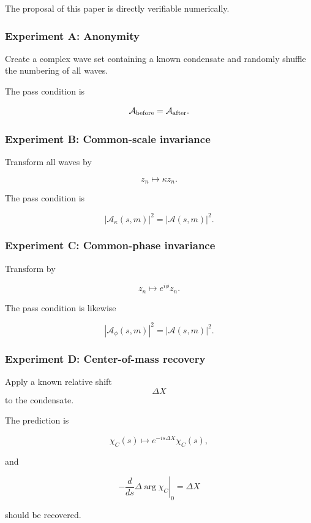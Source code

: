 \documentclass[
  a4paper,
]{article}
\begin{document}
The proposal of this paper is directly verifiable numerically.

\subsubsection{Experiment A: Anonymity}\label{experiment-a-anonymity}

Create a complex wave set containing a known condensate and randomly
shuffle the numbering of all waves.

The pass condition is

\[
\mathcal A_{\rm before}
=
\mathcal A_{\rm after}.
\]

\subsubsection{Experiment B: Common-scale
invariance}\label{experiment-b-common-scale-invariance}

Transform all waves by

\[
z_n\mapsto\kappa z_n.
\]

The pass condition is

\[
|\mathcal A_{\kappa}(s,m)|^2
=
|\mathcal A(s,m)|^2.
\]

\subsubsection{Experiment C: Common-phase
invariance}\label{experiment-c-common-phase-invariance}

Transform by

\[
z_n\mapsto e^{i\phi}z_n.
\]

The pass condition is likewise

\[
|\mathcal A_{\phi}(s,m)|^2
=
|\mathcal A(s,m)|^2.
\]

\subsubsection{Experiment D: Center-of-mass
recovery}\label{experiment-d-center-of-mass-recovery}

Apply a known relative shift \[\Delta X\] to the condensate.

The prediction is

\[
\chi_C(s)
\mapsto
 e^{-is\Delta X}
\chi_C(s),
\]

and

\[
{-}
\left.
\frac{d}{ds}
\Delta\arg\chi_C
\right|_0
=
\Delta X
\tag{46}
\]

should be recovered.
\end{document}
